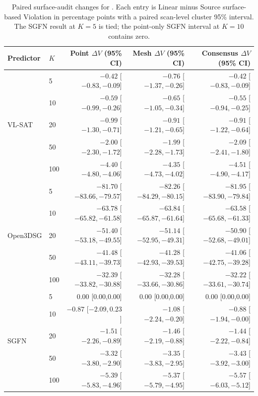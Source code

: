 \begin{table}[t]
\centering
{\small
\setlength{\tabcolsep}{2.0pt}
\begin{tabular}{llrrr}
\toprule
Predictor & $K$ & Point $\Delta V$ (95\% CI) & Mesh $\Delta V$ (95\% CI) & Consensus $\Delta V$ (95\% CI) \\
\midrule
\multirow{5}{*}{VL-SAT}
 & 5   & $-0.42$ [$-0.83,-0.09$] & $-0.76$ [$-1.37,-0.26$] & $-0.42$ [$-0.83,-0.09$] \\
 & 10  & $-0.59$ [$-0.99,-0.26$] & $-0.65$ [$-1.05,-0.34$] & $-0.55$ [$-0.94,-0.25$] \\
 & 20  & $-0.99$ [$-1.30,-0.71$] & $-0.91$ [$-1.21,-0.65$] & $-0.91$ [$-1.22,-0.64$] \\
 & 50  & $-2.00$ [$-2.30,-1.72$] & $-1.99$ [$-2.28,-1.73$] & $-2.09$ [$-2.41,-1.80$] \\
 & 100 & $-4.40$ [$-4.80,-4.06$] & $-4.35$ [$-4.73,-4.02$] & $-4.51$ [$-4.90,-4.17$] \\
\midrule
\multirow{5}{*}{Open3DSG}
 & 5   & $-81.70$ [$-83.66,-79.57$] & $-82.26$ [$-84.29,-80.15$] & $-81.95$ [$-83.90,-79.84$] \\
 & 10  & $-63.78$ [$-65.82,-61.58$] & $-63.84$ [$-65.87,-61.64$] & $-63.58$ [$-65.68,-61.33$] \\
 & 20  & $-51.40$ [$-53.18,-49.55$] & $-51.14$ [$-52.95,-49.31$] & $-50.90$ [$-52.68,-49.01$] \\
 & 50  & $-41.48$ [$-43.11,-39.73$] & $-41.28$ [$-42.93,-39.53$] & $-41.06$ [$-42.75,-39.28$] \\
 & 100 & $-32.39$ [$-33.82,-30.88$] & $-32.28$ [$-33.66,-30.86$] & $-32.22$ [$-33.61,-30.74$] \\
\midrule
\multirow{5}{*}{SGFN}
 & 5   & 0.00 [0.00,0.00] & 0.00 [0.00,0.00] & 0.00 [0.00,0.00] \\
 & 10  & $-0.87$ [$-2.09,0.23$] & $-1.08$ [$-2.24,-0.20$] & $-0.88$ [$-1.94,-0.00$] \\
 & 20  & $-1.51$ [$-2.26,-0.89$] & $-1.46$ [$-2.19,-0.88$] & $-1.44$ [$-2.22,-0.84$] \\
 & 50  & $-3.32$ [$-3.80,-2.90$] & $-3.35$ [$-3.83,-2.95$] & $-3.43$ [$-3.92,-3.00$] \\
 & 100 & $-5.39$ [$-5.83,-4.96$] & $-5.37$ [$-5.79,-4.95$] & $-5.57$ [$-6.03,-5.12$] \\
\bottomrule
\end{tabular}
}
\caption{Paired surface-audit changes for \methodlinear{}. Each entry is Linear minus Source
surface-based Violation in percentage points with a paired scan-level cluster
95\% interval. The SGFN result at $K=5$ is tied; the point-only SGFN interval at
$K=10$ contains zero.}
\label{tab:surface-audit-ci}
\end{table}


